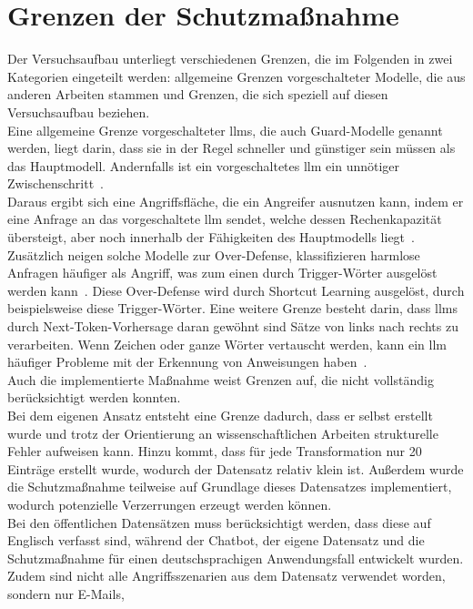 \section{Grenzen der Schutzmaßnahme}

Der Versuchsaufbau unterliegt verschiedenen Grenzen, die im Folgenden in zwei Kategorien eingeteilt werden: allgemeine Grenzen vorgeschalteter Modelle, die aus
anderen Arbeiten stammen und Grenzen, die sich speziell auf diesen Versuchsaufbau beziehen. \\
Eine allgemeine Grenze vorgeschalteter \ac{llm}s, die auch Guard-Modelle genannt werden, liegt darin, dass sie in der Regel schneller und günstiger sein müssen als das Hauptmodell.
Andernfalls ist ein vorgeschaltetes \ac{llm} ein unnötiger Zwischenschritt~\cite[1]{sm36}. \\
Daraus ergibt sich eine Angriffsfläche, die ein Angreifer ausnutzen kann, indem er eine Anfrage an das vorgeschaltete \ac{llm} sendet, welche dessen Rechenkapazität übersteigt, aber noch 
innerhalb der Fähigkeiten des Hauptmodells liegt~\cite[2]{sm36}. Zusätzlich neigen solche Modelle zur Over-Defense, klassifizieren harmlose Anfragen häufiger
als Angriff, was zum einen durch Trigger-Wörter ausgelöst werden kann~\cite[1\psq]{sm37}. Diese Over-Defense wird durch Shortcut Learning ausgelöst, durch 
beispielsweise diese Trigger-Wörter. Eine weitere Grenze besteht darin, dass \ac{llm}s durch Next-Token-Vorhersage daran gewöhnt sind Sätze von links nach rechts zu verarbeiten.
Wenn Zeichen oder ganze Wörter vertauscht werden, kann ein \ac{llm} häufiger Probleme mit der Erkennung von Anweisungen haben~\cite[4]{sm38}. \\
Auch die implementierte Maßnahme weist Grenzen auf, die nicht vollständig berücksichtigt werden konnten. \\
Bei dem eigenen Ansatz entsteht eine Grenze dadurch, dass er selbst erstellt wurde und trotz der Orientierung an wissenschaftlichen Arbeiten strukturelle Fehler
aufweisen kann. Hinzu kommt, dass für jede Transformation nur 20 Einträge erstellt wurde, wodurch der Datensatz relativ klein ist. Außerdem wurde die Schutzmaßnahme
teilweise auf Grundlage dieses Datensatzes implementiert, wodurch potenzielle Verzerrungen erzeugt werden können. \\
Bei den öffentlichen Datensätzen muss berücksichtigt werden, dass diese auf Englisch verfasst sind, während der Chatbot, der eigene Datensatz und die Schutzmaßnahme
für einen deutschsprachigen Anwendungsfall entwickelt wurden. Zudem sind nicht alle Angriffsszenarien aus dem Datensatz verwendet worden, sondern nur E-Mails, 
